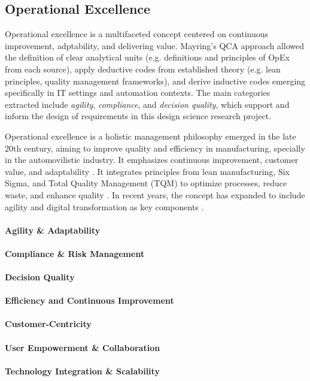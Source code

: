 \subsection{Operational Excellence}\label{subsec:op-ex}
Operational excellence is a multifaceted concept centered on continuous improvement, adptability, and delivering value. Mayring's QCA approach allowed the definition of clear analytical units (e.g. definitions and principles of OpEx from each source), apply deductive codes from established theory (e.g. lean principles, quality management frameworks), and derive inductive codes emerging specifically in IT settings and automation contexts. The main categories extracted include \emph{agility}, \emph{compliance}, and \emph{decision quality}, which support and inform the design of requirements in this design science research project.

Operational excellence is a holistic management philosophy emerged in the late 20th century, aiming to improve quality and efficiency in manufacturing, specially in the automovilistic industry. It emphasizes continuous improvement, customer value, and adaptability \parencite{womackLean2013}. It integrates principles from lean manufacturing, Six Sigma, and Total Quality Management (TQM) to optimize processes, reduce waste, and enhance quality \parencite{juranQualityControlHandbook2010}. In recent years, the concept has expanded to include agility and digital transformation as key components \parencite{hammerWhatIsBusiness2007}.
\paragraph{Agility \& Adaptability}

\paragraph{Compliance & Risk Management}
\paragraph{Decision Quality}
\paragraph{Efficiency and Continuous Improvement}
\paragraph{Customer-Centricity}
\paragraph{User Empowerment \& Collaboration}
\paragraph{Technology Integration \& Scalability}